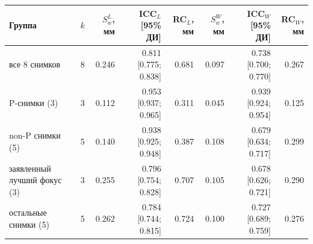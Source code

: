 \begin{tabular}{@{}lrrrrrrr@{}}
\toprule
Группа & $k$ & $S_w^{L}$, мм & ICC$_L$ [95\% ДИ] & RC$_L$, мм &
$S_w^{W}$, мм & ICC$_W$ [95\% ДИ] & RC$_W$, мм \\
\midrule
все 8 снимков & 8 & \num{0.246} & \num{0.811} [\num{0.775}; \num{0.838}] & \num{0.681} & \num{0.097} & \num{0.738} [\num{0.700}; \num{0.770}] & \num{0.267} \\
P-снимки (3) & 3 & \num{0.112} & \num{0.953} [\num{0.937}; \num{0.965}] & \num{0.311} & \num{0.045} & \num{0.939} [\num{0.924}; \num{0.954}] & \num{0.125} \\
non-P снимки (5) & 5 & \num{0.140} & \num{0.938} [\num{0.925}; \num{0.948}] & \num{0.387} & \num{0.108} & \num{0.679} [\num{0.634}; \num{0.717}] & \num{0.299} \\
заявленный лучший фокус (3) & 3 & \num{0.255} & \num{0.796} [\num{0.754}; \num{0.828}] & \num{0.707} & \num{0.105} & \num{0.678} [\num{0.626}; \num{0.721}] & \num{0.290} \\
остальные снимки (5) & 5 & \num{0.262} & \num{0.784} [\num{0.744}; \num{0.815}] & \num{0.724} & \num{0.100} & \num{0.727} [\num{0.689}; \num{0.759}] & \num{0.276} \\
\bottomrule
\end{tabular}
